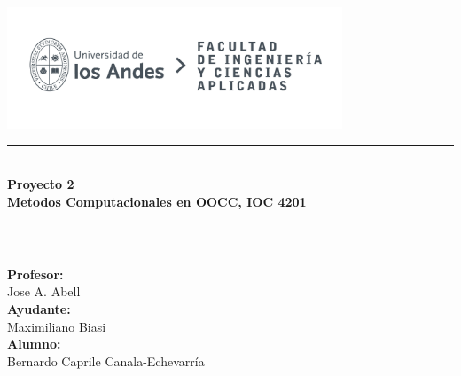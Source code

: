 \documentclass{article}  %
\begin{document}
\begin{titlepage}%
\newcommand{\HRule}{\rule{\linewidth}{0.5mm}} 
\center 
\includegraphics[width=10cm]{LOGO_UNIVERSIDAD.jpg}\\ %
\vspace{3cm}
\HRule \\[0.4cm]
{ \huge \bfseries Proyecto 2}\\[0.4cm] %
{ \huge \bfseries Metodos Computacionales en OOCC, IOC 4201}\\[0.4cm] %
\HRule \\[1.5cm]
 \vspace{4.5cm}
\begin{flushright}
    { \textbf{Profesor:}\\
    Jose A. Abell\\
    \vspace{0.2cm}
    \textbf{Ayudante:} \\
    Maximiliano Biasi\\
    \vspace{0.2cm}
    \textbf{Alumno:} \\
    Bernardo Caprile Canala-Echevarría\\
}
\end{flushright}
\end{titlepage}
\end{document}
